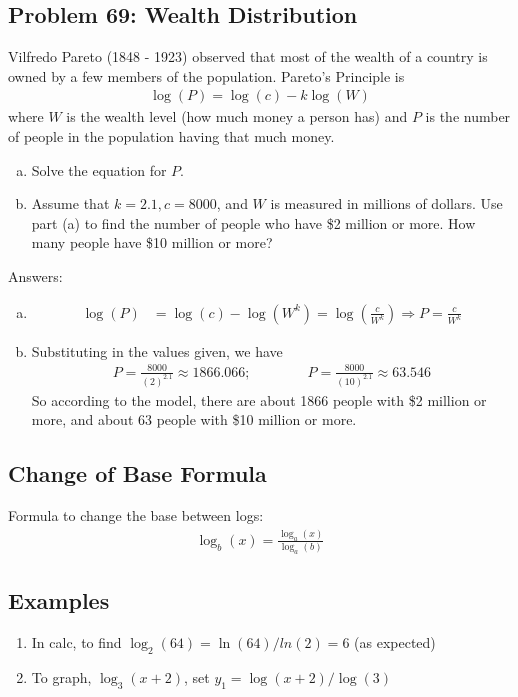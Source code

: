 \documentclass{tufte-handout}
\begin{document}
\subsection{Problem 69: Wealth Distribution}
Vilfredo Pareto (1848 - 1923) observed that most of the wealth of a country is owned by a few members of the population. Pareto's Principle is
\begin{align*}
\log(P) = \log(c) - k\log(W)
\end{align*}
where $W$ is the wealth level (how much money a person has) and $P$ is the number of people in the population having that much money.
\begin{enumerate}[(a)]
\item Solve the equation for $P$.
\item Assume that $k = 2.1, c = 8000$, and $W$ is measured in millions of dollars. Use part (a) to find the number of people who have \$2 million or more. How many people have \$10 million or more?
\end{enumerate}
Answers:
\begin{enumerate}[(a)]
\item \begin{align*}
\log(P) &= \log(c) - \log(W^k) = \log\left(\frac{c}{W^k}\right) \Rightarrow
P = \frac{c}{W^k}
\end{align*}
\item Substituting in the values given, we have
\begin{align*}
P = \frac{8000}{(2)^{2.1}} \approx 1866.066; \qquad \qquad
P = \frac{8000}{(10)^{2.1}} \approx 63.546
\end{align*}
So according to the model, there are about 1866 people with \$2 million or more, and about 63 people with \$10 million or more.
\end{enumerate}

\subsection{Change of Base Formula}
Formula to change the base between logs:
\begin{align*}
\log_b(x) = \frac{\log_a(x)}{\log_a(b)}
\end{align*}

\subsection{Examples}
\begin{enumerate}
\item In calc, to find $\log_2(64) = \ln(64)/ln(2) = 6$ (as expected)
\item To graph, $\log_3(x + 2)$, set $y_1 = \log(x + 2)/\log(3)$ 
\end{enumerate}
\end{document}
